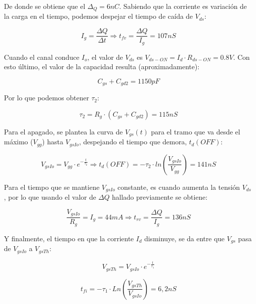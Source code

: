 \documentclass[e4_tp1_main.tex]{subfiles}
\begin{document}
De donde se obtiene que el $\Delta_Q = 6nC$. Sabiendo que la corriente es variación de la carga en el tiempo, podemos despejar el tiempo de caída de $V_{ds}$:

\[
I_g = \frac{\Delta Q}{\Delta t} \Longrightarrow t_{fv} = \frac{\Delta Q}{I_g} = 107nS
\]

Cuando el canal conduce $I_o$, el valor de $V_{ds}$ es $V_{ds-ON} = I_d \cdot R_{ds-ON} = 0.8V$. Con esto último, el valor de la capacidad resulta (aproximadamente):

\[
C_{gs} + C_{gd2} = 1150pF
\]

Por lo que podemos obtener $\tau_2$:

\[
\tau_2 = R_g \cdot (C_{gs} + C_{gd2}) = 115nS
\]

Para el apagado, se plantea la curva de $V_{gs}(t)$ para el tramo que va desde el máximo ($V_{gg}$) hasta $V_{gsIo}$, despejando el tiempo que demora, $t_d(OFF)$:

\[
V_{gsIo} = V_{gg} \cdot e^{-\frac{t}{\tau_2}} \Longrightarrow t_d(OFF) = -\tau_2 \cdot ln\left( \frac{V_{gsIo}}{V_{gg}} \right) = 141nS
\]

Para el tiempo que se mantiene $V_{gsIo}$ constante, es cuando aumenta la tensión $V_{ds}$, por lo que usando el valor de $\Delta Q$ hallado previamente se obtiene:

\[
\frac{V_{gsIo}}{R_g} = I_g = 44mA \Longrightarrow t_{rv} = \frac{\Delta Q}{I_g} = 136nS
\]

Y finalmente, el tiempo en que la corriente $I_d$ disminuye, se da entre que $V_{gs}$ pasa de $V_{gsIo}$ a $V_{gsTh}$:

\[
V_{gsTh} = V_{gsIo} \cdot e^{-\frac{t}{\tau_1}}
\]

\[
t_{fi} = -\tau_1 \cdot Ln \left( \frac{V_{gsTh}}{V_{gsIo}}\right) = 6,2nS
\]
 
\newpage
\end{document}
